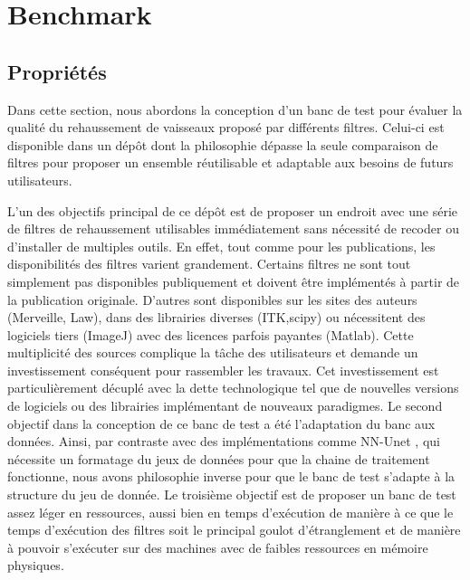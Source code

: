%

\chapter{Benchmark}
\label{sec:Benchmark}


\section{Propriétés}
\label{sec:Benchmark}

Dans cette section, nous abordons la conception d'un banc de test pour évaluer la qualité du rehaussement de vaisseaux proposé par différents filtres. Celui-ci est disponible dans un dépôt dont la philosophie dépasse la seule comparaison de filtres pour proposer un ensemble réutilisable et adaptable aux besoins de futurs utilisateurs.

L'un des objectifs principal de ce dépôt est de proposer un endroit avec une série de filtres de rehaussement utilisables immédiatement sans nécessité de  recoder ou d'installer de multiples outils. En effet, tout comme pour les publications, les disponibilités des filtres varient grandement. Certains filtres ne sont tout simplement pas disponibles publiquement et doivent être implémentés à partir de la publication originale. D'autres sont disponibles sur les sites des auteurs (Merveille, Law), dans des librairies diverses (ITK,scipy) ou nécessitent des logiciels tiers (ImageJ) avec des licences parfois payantes (Matlab). Cette multiplicité des sources complique la tâche des utilisateurs et demande un investissement conséquent pour rassembler les travaux. Cet investissement est particulièrement décuplé avec la dette technologique tel que de nouvelles versions de logiciels ou des librairies implémentant de nouveaux paradigmes.
Le second objectif dans la conception de ce banc de test a été l'adaptation du banc aux données. Ainsi, par contraste avec des implémentations comme NN-Unet \cite{Isensee2021_NN-Unet}, qui nécessite un formatage du jeux de données pour que la chaine de traitement fonctionne, nous avons philosophie inverse pour que le banc de test s'adapte à la structure du jeu de donnée.
Le troisième objectif est de proposer un banc de test assez léger en ressources, aussi bien en temps d'exécution de manière à ce que le temps d'exécution des filtres soit le principal goulot d'étranglement et de manière à pouvoir s'exécuter sur des machines avec de faibles ressources en mémoire physiques.

